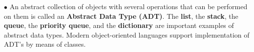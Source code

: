 \vskip 3mm
$\bullet$ An abstract collection of objects with several operations that can be performed on them is called an {\bf Abstract Data Type (ADT)}. The {\bf list}, the {\bf stack}, the {\bf queue}, the {\bf priority queue}, and the {\bf dictionary} are important examples of abstract data types. Modern object-oriented languages support implementation of ADT's by means of classes.





\vfill\eject
\bye
